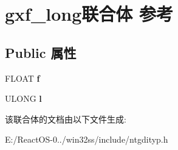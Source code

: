 \hypertarget{uniongxf__long}{}\section{gxf\+\_\+long联合体 参考}
\label{uniongxf__long}
\subsection*{Public 属性}
\begin{DoxyCompactItemize}
\item 
\mbox{\label{uniongxf__long_a4cf31db0d5ac0603f22132b4beaf9986}} 
F\+L\+O\+AT {\bfseries f}
\item 
\mbox{\label{uniongxf__long_a31ca021cd93217976bbd206f3f22c8ed}} 
U\+L\+O\+NG {\bfseries l}
\end{DoxyCompactItemize}


该联合体的文档由以下文件生成\+:\begin{DoxyCompactItemize}
\item 
E\+:/\+React\+O\+S-\/0../win32ss/include/ntgdityp.\+h\end{DoxyCompactItemize}
